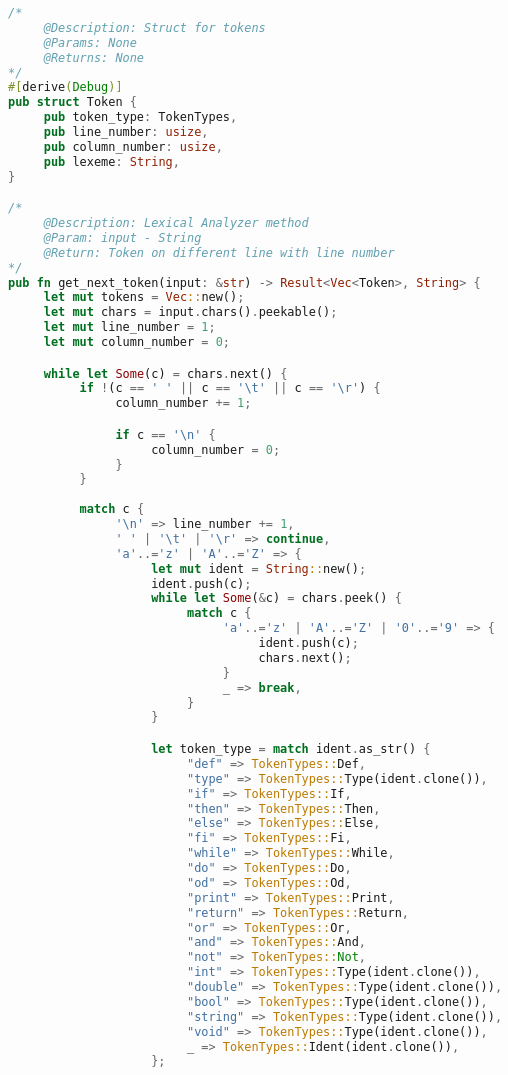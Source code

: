 \documentclass[12pt]{article}
\begin{document}
{\begin{lstlisting}[language=Rust]
/*
     @Description: Struct for tokens
     @Params: None
     @Returns: None
*/
#[derive(Debug)]
pub struct Token {
     pub token_type: TokenTypes,
     pub line_number: usize,
     pub column_number: usize,
     pub lexeme: String,
}

/* 
     @Description: Lexical Analyzer method
     @Param: input - String
     @Return: Token on different line with line number
*/
pub fn get_next_token(input: &str) -> Result<Vec<Token>, String> {
     let mut tokens = Vec::new();
     let mut chars = input.chars().peekable();
     let mut line_number = 1;
     let mut column_number = 0;

     while let Some(c) = chars.next() {
          if !(c == ' ' || c == '\t' || c == '\r') {
               column_number += 1;

               if c == '\n' {
                    column_number = 0;
               }
          }
          
          match c {
               '\n' => line_number += 1,
               ' ' | '\t' | '\r' => continue,
               'a'..='z' | 'A'..='Z' => {
                    let mut ident = String::new();
                    ident.push(c);
                    while let Some(&c) = chars.peek() {
                         match c {
                              'a'..='z' | 'A'..='Z' | '0'..='9' => {
                                   ident.push(c);
                                   chars.next();
                              }
                              _ => break,
                         }
                    }

                    let token_type = match ident.as_str() {
                         "def" => TokenTypes::Def,
                         "type" => TokenTypes::Type(ident.clone()),
                         "if" => TokenTypes::If,
                         "then" => TokenTypes::Then,
                         "else" => TokenTypes::Else,
                         "fi" => TokenTypes::Fi,
                         "while" => TokenTypes::While,
                         "do" => TokenTypes::Do,
                         "od" => TokenTypes::Od,
                         "print" => TokenTypes::Print,
                         "return" => TokenTypes::Return,
                         "or" => TokenTypes::Or,
                         "and" => TokenTypes::And,
                         "not" => TokenTypes::Not,
                         "int" => TokenTypes::Type(ident.clone()),
                         "double" => TokenTypes::Type(ident.clone()),
                         "bool" => TokenTypes::Type(ident.clone()),
                         "string" => TokenTypes::Type(ident.clone()),
                         "void" => TokenTypes::Type(ident.clone()),
                         _ => TokenTypes::Ident(ident.clone()),
                    };
                    

\end{lstlisting}}
\end{document}
